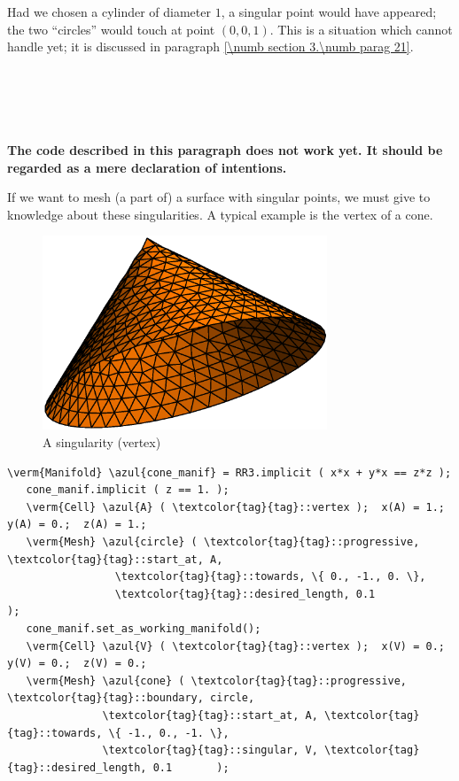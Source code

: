 Had we chosen a cylinder of diameter $1$, a singular point would have appeared;
the two ``circles'' would touch at point $ (0,0,1) $.
This is a situation which {\maniFEM} cannot handle yet; it is discussed in paragraph
\ref{\numb section 3.\numb parag 21}.


\section{~~}\label{\numb section 3.\numb parag 20}

{\normalfont\bfseries The code described in this paragraph does not work yet.
It should be regarded as a mere declaration of intentions.}
\medskip

If we want to mesh (a part of) a surface with singular points, we must give to {\maniFEM}
knowledge about these singularities.
A typical example is the vertex of a cone.

\begin{figure}[ht] \centering
 \includegraphics[width=85mm]{cone}
  \caption{A singularity (vertex)}
  \label{\numb section 3.\numb fig 8}
\end{figure}

\begin{Verbatim}[commandchars=\\\{\},formatcom=\small\tt,frame=single,
   label=code not working,rulecolor=\color{coment},
   baselinestretch=0.94,framesep=2mm                                  ]
   \verm{Manifold} \azul{cone_manif} = RR3.implicit ( x*x + y*x == z*z );
   cone_manif.implicit ( z == 1. );
   \verm{Cell} \azul{A} ( \textcolor{tag}{tag}::vertex );  x(A) = 1.;  y(A) = 0.;  z(A) = 1.;
   \verm{Mesh} \azul{circle} ( \textcolor{tag}{tag}::progressive, \textcolor{tag}{tag}::start_at, A,
                 \textcolor{tag}{tag}::towards, \{ 0., -1., 0. \},
                 \textcolor{tag}{tag}::desired_length, 0.1           );
   cone_manif.set_as_working_manifold();
   \verm{Cell} \azul{V} ( \textcolor{tag}{tag}::vertex );  x(V) = 0.;  y(V) = 0.;  z(V) = 0.;
   \verm{Mesh} \azul{cone} ( \textcolor{tag}{tag}::progressive, \textcolor{tag}{tag}::boundary, circle,
               \textcolor{tag}{tag}::start_at, A, \textcolor{tag}{tag}::towards, \{ -1., 0., -1. \},
               \textcolor{tag}{tag}::singular, V, \textcolor{tag}{tag}::desired_length, 0.1       );
\end{Verbatim}


